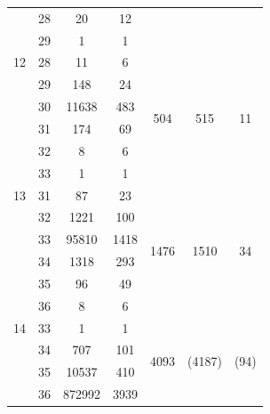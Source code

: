 \begin{table}[htbp]
{\begin{threeparttable}[para]
\begin{tabular}{clccccc}
   & 28  & 20     				& 12   &                       &                       &                     \\
   & 29  & 1      				& 1    &                       &                       &                     \\  \midrule
12 & 28  & 11     				& 6    & \multirow{6}{*}{504}  & \multirow{6}{*}{515}  & \multirow{6}{*}{11} \\
   & 29  & 148    				& 24   &                       &                       &                     \\
   & 30  & 11638  				& 483  &                       &                       &                     \\
   & 31  & 174    				& 69   &                       &                       &                     \\
   & 32  & 8      				& 6    &                       &                       &                     \\
   & 33  & 1      				& 1    &                       &                       &                     \\  \midrule
13 & 31  & 87     				& 23   & \multirow{6}{*}{1476} & \multirow{6}{*}{1510} & \multirow{6}{*}{34} \\
   & 32  & 1221   				& 100  &                       &                       &                     \\
        & 33  & 95810\tnote{a}& 1418 &                       &                       &                     \\
        & 34  & 1318\tnote{a} & 293  &                       &                       &                     \\
   & 35  & 96     				& 49   &                       &                       &                     \\
   & 36  & 8      				& 6    &                       &                       &                     \\  \midrule
        14 & 33  & 1      				& 1    & \multirow{8}{*}{4093} & \multirow{8}{*}{(4187)\tnote{b}}    & \multirow{8}{*}{(94)\tnote{b}}  \\
   & 34  & 707    				& 101  &                       &                       &                     \\
   & 35  & 10537  				& 410  &                       &                       &                     \\
   & 36  & 872992 				& 3939 &                       &                       &                     \\

\end{tabular}
\end{threeparttable}}
\end{table}
